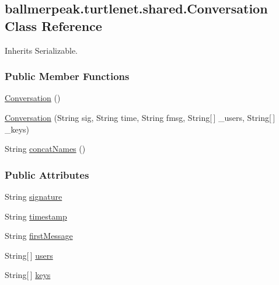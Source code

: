 \hypertarget{classballmerpeak_1_1turtlenet_1_1shared_1_1Conversation}{\subsection{ballmerpeak.\-turtlenet.\-shared.\-Conversation Class Reference}
\label{classballmerpeak_1_1turtlenet_1_1shared_1_1Conversation}
}


Inherits Serializable.

\subsubsection*{Public Member Functions}
\begin{DoxyCompactItemize}
\item 
\hyperlink{classballmerpeak_1_1turtlenet_1_1shared_1_1Conversation_ad6b4ff24aaeabe79a889e7ec35ea6176}{Conversation} ()
\item 
\hyperlink{classballmerpeak_1_1turtlenet_1_1shared_1_1Conversation_aa3742f0590d5fd167e4d20a9c2c633c1}{Conversation} (String sig, String time, String fmsg, String\mbox{[}$\,$\mbox{]} \-\_\-users, String\mbox{[}$\,$\mbox{]} \-\_\-keys)
\item 
String \hyperlink{classballmerpeak_1_1turtlenet_1_1shared_1_1Conversation_aff19390d872b7cc4fe5de755cf2a821e}{concat\-Names} ()
\end{DoxyCompactItemize}
\subsubsection*{Public Attributes}
\begin{DoxyCompactItemize}
\item 
String \hyperlink{classballmerpeak_1_1turtlenet_1_1shared_1_1Conversation_a27bf5eadc5e4a46d79125a2c6b7be9f8}{signature}
\item 
String \hyperlink{classballmerpeak_1_1turtlenet_1_1shared_1_1Conversation_a4b23ef60e0fef247b74eeba61a85036f}{timestamp}
\item 
String \hyperlink{classballmerpeak_1_1turtlenet_1_1shared_1_1Conversation_a3529815cfaa34a63e188ff968c54a70c}{first\-Message}
\item 
String\mbox{[}$\,$\mbox{]} \hyperlink{classballmerpeak_1_1turtlenet_1_1shared_1_1Conversation_a83edd678b2620b5487fb9a93d52b285e}{users}
\item 
String\mbox{[}$\,$\mbox{]} \hyperlink{classballmerpeak_1_1turtlenet_1_1shared_1_1Conversation_af74acc5c9a1d9275fc452171952707f0}{keys}
\end{DoxyCompactItemize}


